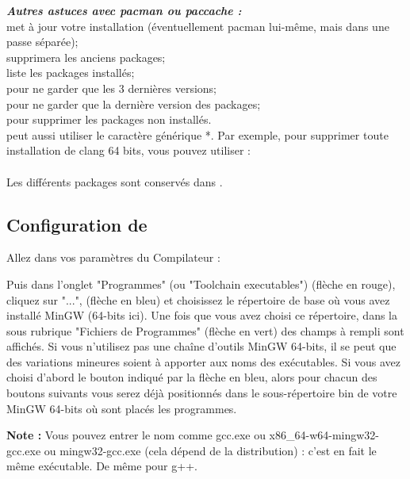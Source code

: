 \textbf{\textit{Autres astuces avec pacman ou paccache :}}\\
 met à jour votre installation (éventuellement pacman lui-même, mais dans une passe séparée);\\
 supprimera les anciens packages;\\
 liste les packages installés;\\
 pour ne garder que les 3 dernières versions;\\
 pour ne garder que la dernière version des packages;\\
 pour supprimer les packages non installés.\\
 peut aussi utiliser le caractère générique *. Par exemple, pour supprimer toute installation de clang 64 bits, vous pouvez utiliser :\\
\\
Les différents packages sont conservés dans .

\newpage
\subsection{Configuration de \codeblocks}

Allez dans vos paramètres du Compilateur :


Puis dans l'onglet "Programmes" (ou "Toolchain executables") (flèche en rouge), cliquez sur "...", (flèche en bleu) et choisissez le répertoire de base où vous avez installé MinGW (64-bits ici). Une fois que vous avez choisi ce répertoire, dans la sous rubrique "Fichiers de Programmes" (flèche en vert) des champs à rempli sont affichés. Si vous n'utilisez pas une chaîne d'outils MinGW 64-bits, il se peut que des variations mineures soient à apporter aux noms des exécutables. Si vous avez choisi d'abord le bouton indiqué par la flèche en bleu, alors pour chacun des boutons suivants vous serez déjà positionnés dans le sous-répertoire bin de votre MinGW 64-bits où sont placés les programmes.


\textbf{Note :} Vous pouvez entrer le nom comme gcc.exe ou x86\_64-w64-mingw32-gcc.exe ou mingw32-gcc.exe (cela dépend de la distribution) : c'est en fait le même exécutable. De même pour g++.

